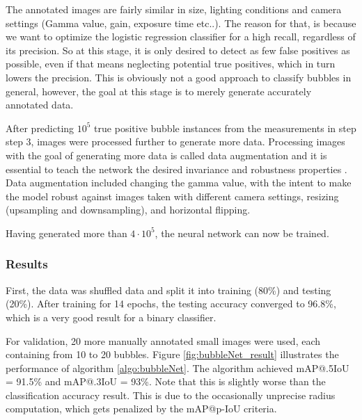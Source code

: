 			The annotated images are fairly similar in size, lighting conditions and camera settings (Gamma value, gain, exposure time etc..). The reason for that, is because we want to optimize the logistic regression classifier for a high recall, regardless of its precision. So at this stage, it is only desired to detect as few false positives as possible, even if that means neglecting potential true positives, which in turn lowers the precision. This is obviously not a good approach to classify bubbles in general, however, the goal at this stage is to merely generate accurately annotated data. 
			
			After predicting $10^5$ true positive bubble instances from the measurements in step step 3, images were processed further to generate more data. Processing images with the goal of generating more data is called data augmentation and it is essential to teach the network the desired invariance and robustness properties \citep{UNet}. Data augmentation included changing the gamma value, with the intent to make the model robust against images taken with different camera settings, resizing (upsampling and downsampling), and horizontal flipping.
			
			Having generated more than $4 \cdot 10^5$, the neural network can now be trained. 
			
			
			
			


			
		\subsubsection{Results}
			
			First, the data was shuffled data and split it into training (80\%) and testing (20\%). After training for 14 epochs, the testing accuracy converged to 96.8\%, which is a very good result for a binary classifier. 
			
			For validation, 20 more manually annotated small images were used, each containing from 10 to 20 bubbles. Figure \ref{fig:bubbleNet_result} illustrates the performance of algorithm \ref{algo:bubbleNet}.  
			The algorithm achieved mAP@.5IoU = 91.5\% and mAP@.3IoU = 93\%. Note that this is slightly worse than the classification accuracy result. This is due to the occasionally unprecise radius computation, which gets penalized by the mAP@p-IoU criteria. 
			

